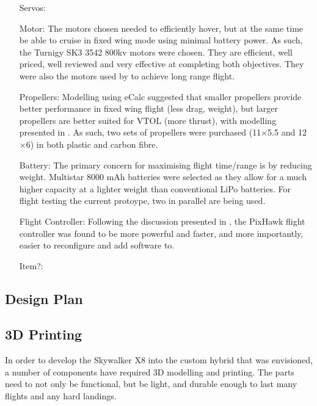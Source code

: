 \begin{itemize}
		\item[Servos:]
	
		\item[Motor:] The motors chosen needed to efficiently hover, but at the same time be able to cruise in fixed wing mode using minimal battery power. As such, the Turnigy SK3 3542 800kv motors were chosen. They are efficient, well priced, well reviewed and very effective at completing both objectives. They were also the motors used by  to achieve long range flight.
	
		\item[Propellers:] Modelling using eCalc suggested that smaller propellers provide better performance in fixed wing flight (less drag, weight), but larger propellers are better suited for VTOL (more thrust), with modelling presented in . As such, two sets of propellers were purchased (11$\times$5.5 and 12$\times$6) in both plastic and carbon fibre.
	
		\item[Battery:] The primary concern for maximising flight time/range is by reducing weight. Multistar 8000 mAh batteries were selected as they allow for a much higher capacity at a lighter weight than conventional LiPo batteries. For flight testing the current protoype, two in parallel are being used. 
	
		\item[Flight Controller:] Following the discussion presented in \cite{ref:controller_comparison}, the PixHawk flight controller was found to be more powerful and faster, and more importantly, easier to reconfigure and add software to.
		
	
		\item[Item?:]
	\end{itemize}
\subsection{Design Plan}

\subsection{3D Printing}
In order to develop the Skywalker X8 into the custom hybrid that was envisioned, a number of components have required 3D modelling and printing. The parts need to not only be functional, but be light, and durable enough to last many flights and any hard landings.\\


